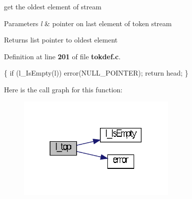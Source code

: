 get the oldest element of stream 


\begin{DoxyParams}{\-Parameters}
{\em l} & pointer on last element of token stream \\
\hline
\end{DoxyParams}
\begin{DoxyReturn}{\-Returns}
list pointer to oldest element 
\end{DoxyReturn}


\-Definition at line {\bf 201} of file {\bf tokdef.\-c}.


\begin{DoxyCode}
                   \{
  \textcolor{keywordflow}{if} (l_IsEmpty(l)) error(NULL_POINTER);
  \textcolor{keywordflow}{return} head;
\}
\end{DoxyCode}


\-Here is the call graph for this function\-:\nopagebreak
\begin{figure}[H]
\begin{center}
\leavevmode
\includegraphics[width=218pt]{tokdef_8h_aa04f7ac992f12dbdcc80fdf4c624f7e9_cgraph}
\end{center}
\end{figure}


